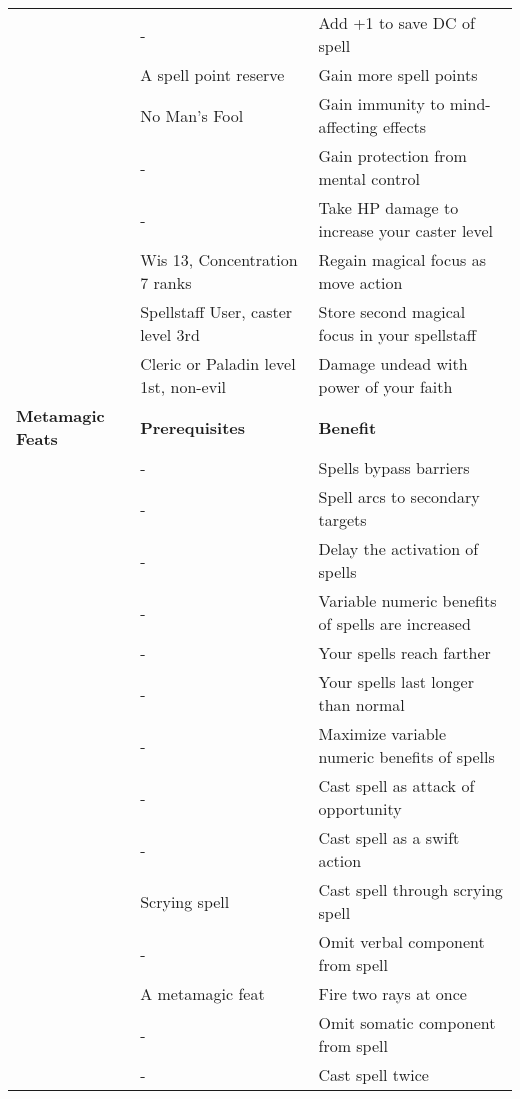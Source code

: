 \begin{table*}
{\begin{tabular}{|p{}|p{}|p{}|}
\nameref{Feat:MagicalEndowment}&-&Add +1 to save DC of spell\\
\nameref{Feat:MagicallyGifted}&A spell point reserve&Gain more spell points\\
\nameref{Feat:MentalFortress}&No Man's Fool&Gain immunity to mind-affecting effects\\
\nameref{Feat:NoMansFool}&-&Gain protection from mental control\\
\nameref{Feat:PushingTheLimits}&-&Take HP damage to increase your caster level\\
\nameref{Feat:RapidRefocusing}&Wis 13, Concentration 7 ranks&Regain magical focus as move action\\
\nameref{Feat:SpellstaffContainment}&Spellstaff User, caster level 3rd&Store second magical focus in your spellstaff\\
\nameref{Feat:TurnUndead}&Cleric or Paladin level 1st, non-evil&Damage undead with power of your faith\\
\hline
\textbf{Metamagic Feats}&\textbf{Prerequisites}&\textbf{Benefit}\\
\hline
\nameref{Feat:BurrowingSpell}&-&Spells bypass barriers\\
\nameref{Feat:ChainSpell}&-&Spell arcs to secondary targets\\
\nameref{Feat:DelaySpell}&-&Delay the activation of spells\\
\nameref{Feat:EmpowerSpell}&-&Variable numeric benefits of spells are increased\\
\nameref{Feat:EnlargeSpell}&-&Your spells reach farther\\
\nameref{Feat:ExtendSpell}&-&Your spells last longer than normal\\
\nameref{Feat:MaximizeSpell}&-&Maximize variable numeric benefits of spells\\
\nameref{Feat:OpportunitySpell}&-&Cast spell as attack of opportunity\\
\nameref{Feat:QuickenSpell}&-&Cast spell as a swift action\\
\nameref{Feat:ScryAndDie}&Scrying spell&Cast spell through scrying spell\\
\nameref{Feat:SilentSpell}&-&Omit verbal component from spell\\
\nameref{Feat:SplitRay}&A metamagic feat&Fire two rays at once\\
\nameref{Feat:StillSpell}&-&Omit somatic component from spell\\
\nameref{Feat:TwinSpell}&-&Cast spell twice\\

\end{tabular}}
\end{table*}
